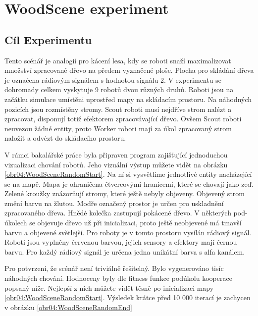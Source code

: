 \section{WoodScene experiment}
\subsection{Cíl Experimentu}
Tento scénář je analogií pro kácení lesa, kdy se roboti snaží maximalizovat množství zpracované dřevo na předem vyznačené ploše. Plocha pro skládání dřeva je označena rádiovým signálem s hodnotou signálu 2. V experimentu se dohromady celkem vyskytuje 9 robotů dvou různých druhů. Roboti jsou na začátku simulace umístěni uprostřed mapy na skládacím prostoru. Na náhodných pozicích jsou rozmístěny stromy. Scout roboti musí nejdříve strom nalézt a zpracovat, disponují totiž efektorem zpracovávající dřevo. Ovšem Scout roboti neuvezou žádné entity, proto Worker roboti mají za úkol zpracovaný strom naložit a odvézt do skládacího prostoru.
\par
V rámci bakalářské práce byla připraven program zajišťující jednoduchou vizualizaci chování robotů. Jeho vizuální výstup můžete vidět na obrázku \ref{obr04:WoodSceneRandomStart}. Na ní si vysvětlíme jednotlivé entity nacházející se na mapě. Mapa je ohraničena čtvercovými hranicemi, které se chovají jako zeď. Zelené kroužky znázorňují stromy, které ještě nebyly objeveny. Objevený strom změní barvu na žlutou. Modře označený prostor je určen pro uskladnění zpracovaného dřeva. Hnědé kolečka zastupují pokácené dřevo. V některých pod-úkolech se objevuje dřevo už při inicializaci, proto ještě neobjevené má tmavší barvu a objevené světlejší. Pro roboty je v tomto prostoru vysílán rádiový signál. Roboti jsou vyplněny červenou barvou, jejich sensory a efektory mají černou barvu. Pro každý rádiový signál je určena jedna unikátní barva s alfa kanálem. \par
Pro potvrzení, že scénář není triviálně řešitelný. Bylo vygenerováno tisíc náhodných chování. Hodnoceny byly dle fitness funkce podúkolu kooperace popsaný níže. Nejlepší z nich můžete vidět těsně po inicializaci mapy \ref{obr04:WoodSceneRandomStart}. Výsledek krátce před 10 000 iterací je zachycen v obrázku \ref{obr04:WoodSceneRandomEnd}

